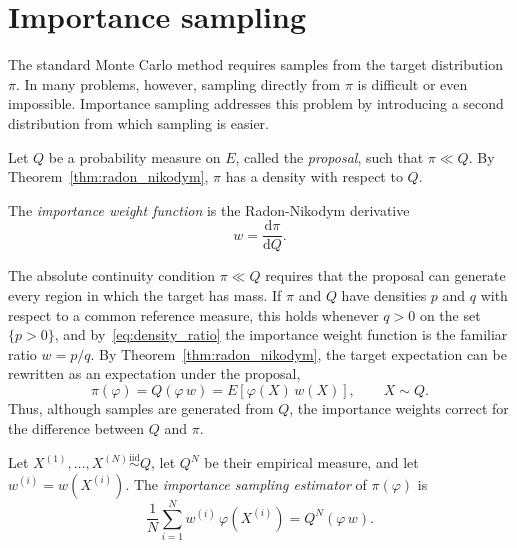 \section{Importance sampling}
\label{sec:importance_sampling}
The standard Monte Carlo method requires samples from the target distribution $\pi$. In many problems, however, sampling directly from $\pi$ is difficult or even impossible. Importance sampling addresses this problem by introducing a second distribution from which sampling is easier.

Let $Q$ be a probability measure on $E$, called the \emph{proposal}, such that $\pi\ll Q$. By Theorem~\ref{thm:radon_nikodym}, $\pi$ has a density with respect to $Q$.

\begin{definition}
    \label{def:importance_weight}
    The \emph{importance weight function} is the Radon-Nikodym derivative
    \begin{equation}
        w = \frac{\mathrm{d}\pi}{\mathrm{d}Q}.
        \label{eq:importance_weight}
    \end{equation}
\end{definition}

The absolute continuity condition $\pi\ll Q$ requires that the proposal can generate every region in which the target has mass. If $\pi$ and $Q$ have densities $p$ and $q$ with respect to a common reference measure, this holds whenever $q>0$ on the set $\{p>0\}$, and by~\eqref{eq:density_ratio} the importance weight function is the familiar ratio $w = p/q$. By Theorem~\ref{thm:radon_nikodym}, the target expectation can be rewritten as an expectation under the proposal,
\begin{equation}
    \pi(\varphi) = Q(\varphi\,w) = E\left[\varphi(X)\,w(X)\right], \qquad X\sim Q.
\end{equation}
Thus, although samples are generated from $Q$, the importance weights correct for the difference between $Q$ and $\pi$.

\begin{definition}
    \label{def:importance_sampling}
    Let $X^{(1)},\ldots,X^{(N)}\overset{\mathrm{iid}}{\sim}Q$, let $Q^N$ be their empirical measure, and let $w^{(i)} = w(X^{(i)})$. The \emph{importance sampling estimator} of $\pi(\varphi)$ is
    \begin{equation}
        \frac{1}{N}\sum_{i=1}^{N}w^{(i)}\,\varphi(X^{(i)}) = Q^N(\varphi\,w).
        \label{eq:importance_sampling_estimator}
    \end{equation}
\end{definition}

